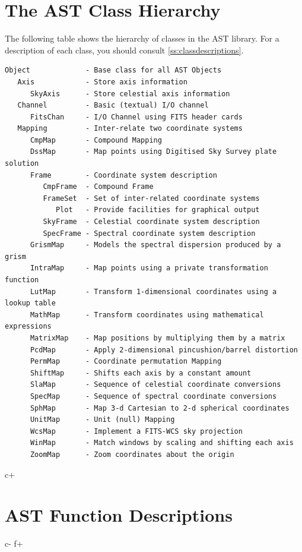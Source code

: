\documentclass[twoside,11pt]{article}
\newcommand{\appref}[1]{Appendix~\ref{#1}}
\renewcommand{\appref}[1]{\ref{#1}}
\begin{document}

\cleardoublepage
\section{\label{ss:classhierarchy}The AST Class Hierarchy}
The following table shows the hierarchy of classes in the AST library.
For a description of each class, you should consult
\appref{ss:classdescriptions}.

\small
\begin{verbatim}
Object             - Base class for all AST Objects
   Axis            - Store axis information
      SkyAxis      - Store celestial axis information
   Channel         - Basic (textual) I/O channel
      FitsChan     - I/O Channel using FITS header cards
   Mapping         - Inter-relate two coordinate systems
      CmpMap       - Compound Mapping
      DssMap       - Map points using Digitised Sky Survey plate solution
      Frame        - Coordinate system description
         CmpFrame  - Compound Frame
         FrameSet  - Set of inter-related coordinate systems
            Plot   - Provide facilities for graphical output
         SkyFrame  - Celestial coordinate system description
         SpecFrame - Spectral coordinate system description
      GrismMap     - Models the spectral dispersion produced by a grism
      IntraMap     - Map points using a private transformation function
      LutMap       - Transform 1-dimensional coordinates using a lookup table
      MathMap      - Transform coordinates using mathematical expressions
      MatrixMap    - Map positions by multiplying them by a matrix
      PcdMap       - Apply 2-dimensional pincushion/barrel distortion
      PermMap      - Coordinate permutation Mapping
      ShiftMap     - Shifts each axis by a constant amount
      SlaMap       - Sequence of celestial coordinate conversions
      SpecMap      - Sequence of spectral coordinate conversions
      SphMap       - Map 3-d Cartesian to 2-d spherical coordinates
      UnitMap      - Unit (null) Mapping
      WcsMap       - Implement a FITS-WCS sky projection
      WinMap       - Match windows by scaling and shifting each axis
      ZoomMap      - Zoom coordinates about the origin
\end{verbatim}
\normalsize

\cleardoublepage
c+
\section{\label{ss:functiondescriptions}AST Function Descriptions}
\small

\normalsize
c-
f+
\end{document}

